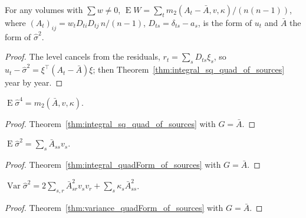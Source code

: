 \begin{theorem}\label{thm:integral_vcW}
  \leanok
  For any volumes with $\sum w \ne 0$,
  $\operatorname{E}W = \sum_t m_2(A_t - \bar A, v, \kappa)/(n(n-1))$, where
  $(A_t)_{ij} = w_tD_{ti}D_{tj}\,n/(n-1)$, $D_{ts} = \delta_{ts} - a_s$, is the form of $u_t$ and
  $\bar A$ the form of $\hat\sigma^2$.
\end{theorem}
\begin{proof}
  \leanok
  The level cancels from the residuals, $r_t = \sum_s D_{ts}\xi_s$, so $u_t - \hat\sigma^2 = \xi^\top(A_t - \bar A)\xi$;
  then Theorem~\ref{thm:integral_sq_quad_of_sources} year by year.
\end{proof}

\begin{theorem}\label{thm:integral_sigHat_sq}
  \leanok
  $\operatorname{E}\hat\sigma^4 = m_2(\bar A, v, \kappa)$.
\end{theorem}
\begin{proof}
  \leanok
  Theorem~\ref{thm:integral_sq_quad_of_sources} with $G = \bar A$.
\end{proof}

\begin{theorem}\label{thm:integral_sigHat}
  \leanok
  $\operatorname{E}\hat\sigma^2 = \sum_s\bar A_{ss}v_s$.
\end{theorem}
\begin{proof}
  \leanok
  Theorem~\ref{thm:integral_quadForm_of_sources} with $G = \bar A$.
\end{proof}

\begin{theorem}\label{thm:variance_sigHat}
  \leanok
  $\operatorname{Var}\hat\sigma^2 = 2\sum_{s,r}\bar A_{sr}^2v_sv_r + \sum_s\kappa_s\bar A_{ss}^2$.
\end{theorem}
\begin{proof}
  \leanok
  Theorem~\ref{thm:variance_quadForm_of_sources} with $G = \bar A$.
\end{proof}

